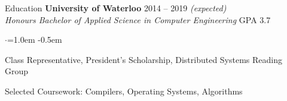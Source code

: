 \documentclass{resume} %
\begin{document}

\begin{rSection}{Education}
  {\bf University of Waterloo} \hfill {2014 -- 2019 \em (expected)} \\
  {\em Honours Bachelor of Applied Science in Computer Engineering} \hfill {GPA 3.7}
  \begin{list}{$\cdot$}{\leftmargin=1.0em}
  \itemsep -0.5em \vspace{-0.5em}
    \item Class Representative, President's Scholarship, Distributed Systems Reading Group
    \item Selected Coursework: Compilers, Operating Systems, Algorithms
  \end{list}
  \vspace{0.5em}
\end{rSection}
\end{document}

